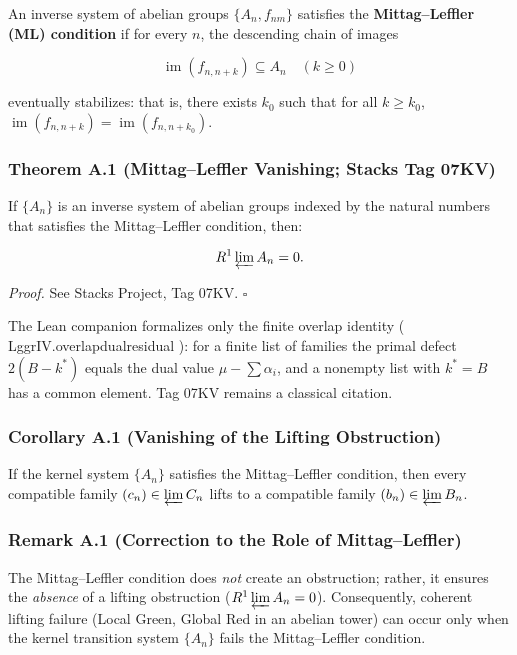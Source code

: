 \documentclass[
  11pt,
]{article}
\theoremstyle{plain}
\theoremstyle{definition}\newtheorem{definition}[theorem]{Definition}
\theoremstyle{remark}\newtheorem*{remark}{Remark}
\DeclareRobustCommand{\texttt}[1]{%
  \ifmmode
    \mathtt{#1}%
  \else
    {\ttfamily\small\renewcommand{\_}{\symbol{95}\allowbreak}#1}%
  \fi}
\begin{document}
An inverse system of abelian groups \(\{A_n, f_{nm}\}\) satisfies the
\textbf{Mittag--Leffler (ML) condition} if for every \(n\), the
descending chain of images

\[
\operatorname{im}(f_{n, n+k}) \subseteq A_n \quad (k \ge 0)
\]

eventually stabilizes: that is, there exists \(k_0\) such that for all
\(k \ge k_0\),
\(\operatorname{im}(f_{n, n+k}) = \operatorname{im}(f_{n, n+k_0})\).

\subsubsection{Theorem A.1 (Mittag--Leffler Vanishing; Stacks Tag
07KV)}\label{theorem-a.1-mittagleffler-vanishing-stacks-tag-07kv}

If \(\{A_n\}\) is an inverse system of abelian groups indexed by the
natural numbers that satisfies the Mittag--Leffler condition, then:

\[
R^1 \varprojlim A_n = 0.
\]

\emph{Proof.} See Stacks Project, Tag 07KV. \(\square\)

The Lean companion formalizes only the finite overlap identity
(\texttt{LggrIV.overlap\_dual\_residual}): for a finite list of families
the primal defect \(2(B-k^*)\) equals the dual value
\(\mu - \sum \alpha_i\), and a nonempty list with \(k^*=B\) has a common
element. Tag 07KV remains a classical citation.

\subsubsection{Corollary A.1 (Vanishing of the Lifting
Obstruction)}\label{corollary-a.1-vanishing-of-the-lifting-obstruction}

If the kernel system \(\{A_n\}\) satisfies the Mittag--Leffler
condition, then every compatible family \((c_n) \in \varprojlim C_n\)
lifts to a compatible family \((b_n) \in \varprojlim B_n\).

\subsubsection{Remark A.1 (Correction to the Role of
Mittag--Leffler)}\label{remark-a.1-correction-to-the-role-of-mittagleffler}

The Mittag--Leffler condition does \emph{not} create an obstruction;
rather, it ensures the \emph{absence} of a lifting obstruction
(\(R^1 \varprojlim A_n = 0\)). Consequently, coherent lifting failure
(Local Green, Global Red in an abelian tower) can occur only when the
kernel transition system \(\{A_n\}\) fails the Mittag--Leffler
condition.
\end{document}
